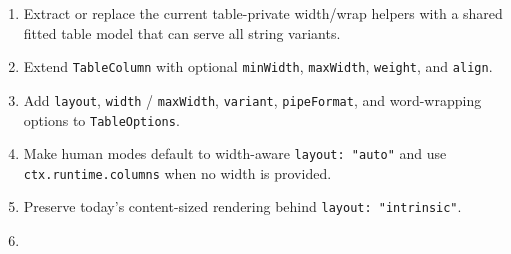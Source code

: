 \begin{enumerate}
\def\labelenumi{\arabic{enumi}.}
\tightlist
\item
  Extract or replace the current table-private width/wrap helpers with a shared fitted table model that can serve all string variants.
\item
  Extend \texttt{T\allowbreak{}a\allowbreak{}b\allowbreak{}l\allowbreak{}e\allowbreak{}C\allowbreak{}o\allowbreak{}l\allowbreak{}u\allowbreak{}m\allowbreak{}n} with optional \texttt{m\allowbreak{}i\allowbreak{}n\allowbreak{}W\allowbreak{}i\allowbreak{}d\allowbreak{}t\allowbreak{}h}, \texttt{m\allowbreak{}a\allowbreak{}x\allowbreak{}W\allowbreak{}i\allowbreak{}d\allowbreak{}t\allowbreak{}h}, \texttt{w\allowbreak{}e\allowbreak{}i\allowbreak{}g\allowbreak{}h\allowbreak{}t}, and \texttt{a\allowbreak{}l\allowbreak{}i\allowbreak{}g\allowbreak{}n}.
\item
  Add \texttt{l\allowbreak{}a\allowbreak{}y\allowbreak{}o\allowbreak{}u\allowbreak{}t}, \texttt{w\allowbreak{}i\allowbreak{}d\allowbreak{}t\allowbreak{}h} / \texttt{m\allowbreak{}a\allowbreak{}x\allowbreak{}W\allowbreak{}i\allowbreak{}d\allowbreak{}t\allowbreak{}h}, \texttt{v\allowbreak{}a\allowbreak{}r\allowbreak{}i\allowbreak{}a\allowbreak{}n\allowbreak{}t}, \texttt{p\allowbreak{}i\allowbreak{}p\allowbreak{}e\allowbreak{}F\allowbreak{}o\allowbreak{}r\allowbreak{}m\allowbreak{}a\allowbreak{}t}, and word-wrapping options to \texttt{T\allowbreak{}a\allowbreak{}b\allowbreak{}l\allowbreak{}e\allowbreak{}O\allowbreak{}p\allowbreak{}t\allowbreak{}i\allowbreak{}o\allowbreak{}n\allowbreak{}s}.
\item
  Make human modes default to width-aware \texttt{l\allowbreak{}a\allowbreak{}y\allowbreak{}o\allowbreak{}u\allowbreak{}t\allowbreak{}:\allowbreak{} \allowbreak{}"\allowbreak{}a\allowbreak{}u\allowbreak{}t\allowbreak{}o\allowbreak{}"} and use \texttt{c\allowbreak{}t\allowbreak{}x\allowbreak{}.\allowbreak{}r\allowbreak{}u\allowbreak{}n\allowbreak{}t\allowbreak{}i\allowbreak{}m\allowbreak{}e\allowbreak{}.\allowbreak{}c\allowbreak{}o\allowbreak{}l\allowbreak{}u\allowbreak{}m\allowbreak{}n\allowbreak{}s} when no width is provided.
\item
  Preserve today's content-sized rendering behind \texttt{l\allowbreak{}a\allowbreak{}y\allowbreak{}o\allowbreak{}u\allowbreak{}t\allowbreak{}:\allowbreak{} \allowbreak{}"\allowbreak{}i\allowbreak{}n\allowbreak{}t\allowbreak{}r\allowbreak{}i\allowbreak{}n\allowbreak{}s\allowbreak{}i\allowbreak{}c\allowbreak{}"}.
\item

\end{enumerate}
